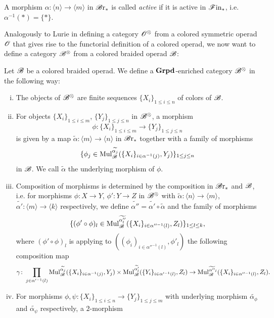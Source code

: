\begin{defin}
    A morphism $\alpha \colon \langle n \rangle \to \langle m \rangle$ in $\mathscr{B} \text{r}_{\ast}$
    is called \emph{active} if it is active in $\mathscr{F} \text{in}_{\ast}$, i.e. $\alpha^{-1}(\ast) =
    \{\ast\}$.
\end{defin}

Analogously to Lurie in \cite{ha} defining a category $\mathscr{O}^{\otimes}$ from a colored
symmetric operad $\mathscr{O}$ that gives rise to the functorial definition of a colored
operad, we now want to define a category $\mathscr{B}^{\otimes}$ from a colored braided operad
$\mathscr{B}$:

\begin{defin}\label{def:B-tensor} Let $\mathscr{B}$ be a colored braided operad. We
    define a $\operatorname{\textbf{Grpd}}$-enriched category $\mathscr{B}^{\otimes}$ in the following way:
    \begin{enumerate}[(i)]
        \item The objects of $\mathscr{B}^{\otimes}$ are finite sequences $\{X_i\}_{1 \leq i \leq
        n}$ of colors of $\mathscr{B}$.
        \item For objects $\{X_i\}_{1 \leq i \leq m}$, $\{Y_j\}_{1 \leq j \leq
        n}$ in $\mathscr{B}^{\otimes}$, a morphism 
        \[
            \phi \colon \{X_i\}_{1 \leq i \leq m} \to \{Y_j\}_{1 \leq j \leq n}
        \]
        is given by a map $\widetilde{\alpha} \colon \langle m \rangle \to
        \langle n \rangle$ in $\mathscr{B} \text{r}_{\ast}$ together with a family of morphisms
        \[
            \{ \phi_j \in \operatorname{Mul}_{\mathscr{B}}^{\widetilde{\alpha_j}}(\{X_i\}_{i \in \alpha^{-1}(j)}, Y_j)\}_{1 \leq j \leq n}
        \]
        in $\mathscr{B}$. We call $\widetilde{\alpha}$ the underlying morphism of $\phi$.
        \item Composition of morphisms is determined by the composition in
        $\mathscr{B} \text{r}_{\ast}$ and $\mathscr{B}$, i.e. for morphisms $\phi \colon X \to Y$, $\phi' \colon
        Y \to Z$ in $\mathscr{B}^{\otimes}$  with $\widetilde{\alpha} \colon \langle n \rangle \to
        \langle m \rangle$, $\widetilde{\alpha'} \colon \langle m \rangle \to
        \langle k \rangle$ respectively, we define $\widetilde{\alpha''} =
        \widetilde{\alpha'} \circ \widetilde{\alpha}$ and the family of
        morphisms
        \[
            \{(\phi' \circ \phi)_l \in  \operatorname{Mul}_{\mathscr{B}}^{\widetilde{\alpha''_l}}(\{X_i\}_{i \in \alpha''^{-1}(l)}, Z_l)\}_{1 \leq l \leq k},
        \]
        where $(\phi' \circ \phi)_l$ is applying to $((\phi_i)_{i \in
        \alpha''^{-1}(l)}, \phi'_l)$ the following composition map 
        \[
            \gamma \colon \prod_{j \in \alpha'^{-1}(l)} \operatorname{Mul}_{\mathscr{B}}^{\widetilde{\alpha_j}}(\{X_i\}_{i \in \alpha^{-1}(j)},Y_j) \times \operatorname{Mul}_{\mathscr{B}}^{\widetilde{\alpha'_l}}(\{Y_i\}_{i \in \alpha'^{-1}(l)},Z_l) \to \operatorname{Mul}_{\mathscr{B}}^{\widetilde{\alpha''}_l}(\{X_i\}_{i \in \alpha''^{-1}(l)},Z_l).
        \] 
        \item For morphisms $\phi, \psi \colon \{X_i\}_{1 \leq i \leq n} \to
        \{Y_j\}_{1 \leq j \leq m}$ with underlying morphism
        $\widetilde{\alpha_{\phi}}$ and $\widetilde{\alpha_{\psi}}$
        respectively, a $2$-morphism 


\end{enumerate}
\end{defin}
